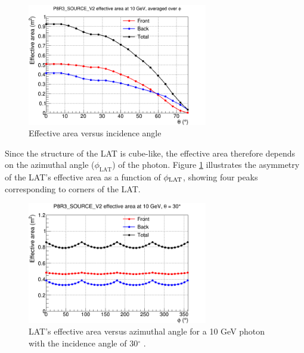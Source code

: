 \begin{figure}[h!]
    \centering
    \includegraphics[width=0.7\textwidth]{content/background/figures/eff_theta.png}
    \caption{Effective area versus incidence angle \citep{lat_p8_performance}}
    \label{fig:eff_theta}
\end{figure}

Since the structure of the LAT is cube-like, the effective area
therefore depends on the azimuthal angle
($\phi_\text{LAT}$) of the photon. Figure \ref{fig:eff_theta} illustrates
the asymmetry of the LAT's effective area as a function of
$\phi_{\rm LAT}$, showing four peaks corresponding to corners
of the LAT.

\begin{figure}[h!]
    \centering
    \includegraphics[width=0.7\textwidth]{content/background/figures/eff_phi.png}
    \caption{
        LAT's effective area versus azimuthal angle for
        a 10 GeV photon with the incidence angle
        of 30$^\circ$ \citep{lat_p8_performance}.
    }
    \label{fig:eff_phi}
\end{figure}

